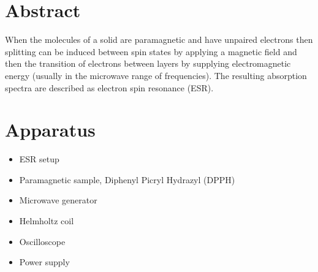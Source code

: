 \section{Abstract}
When the molecules of a solid are paramagnetic and have unpaired electrons then splitting can be induced between spin states by applying a magnetic field and then the transition of electrons between layers by supplying electromagnetic energy (usually in the microwave range of frequencies). The resulting absorption spectra are described as electron spin resonance (ESR).

\section{Apparatus}
	\begin{itemize}
		\item ESR setup
		\item Paramagnetic sample, Diphenyl Picryl Hydrazyl (DPPH)
		\item Microwave generator
		\item Helmholtz coil
		\item Oscilloscope
		\item Power supply
	\end{itemize}